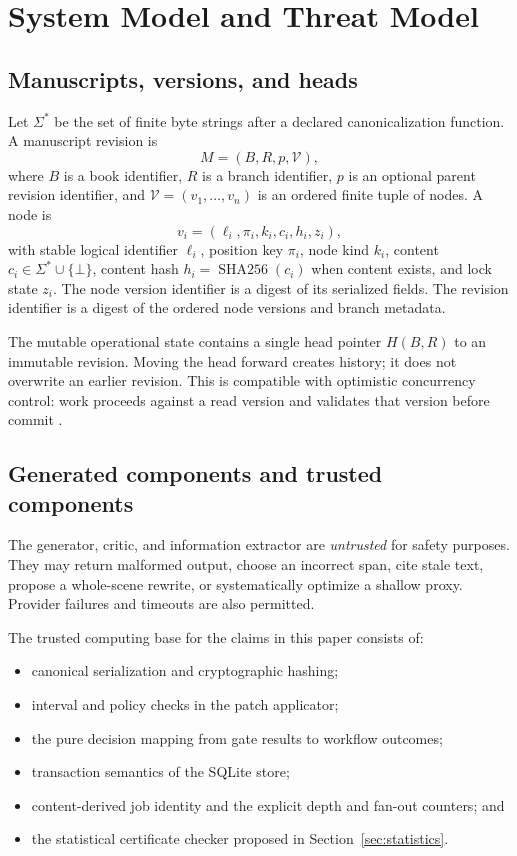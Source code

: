 \documentclass[11pt]{article}
\newcommand{\sha}{\operatorname{SHA256}}
\begin{document}
\section{System Model and Threat Model}

\subsection{Manuscripts, versions, and heads}

Let $\Sigma^*$ be the set of finite byte strings after a declared canonicalization function.
A manuscript revision is
\[
  M = (B, R, p, \mathcal{V}),
\]
where $B$ is a book identifier, $R$ is a branch identifier, $p$ is an optional parent
revision identifier, and $\mathcal{V}=(v_1,\ldots,v_n)$ is an ordered finite tuple of nodes.
A node is
\[
  v_i=(\ell_i,\pi_i,k_i,c_i,h_i,z_i),
\]
with stable logical identifier $\ell_i$, position key $\pi_i$, node kind $k_i$, content
$c_i\in\Sigma^*\cup\{\bot\}$, content hash $h_i=\sha(c_i)$ when content exists, and lock
state $z_i$. The node version identifier is a digest of its serialized fields. The revision
identifier is a digest of the ordered node versions and branch metadata.

The mutable operational state contains a single head pointer $H(B,R)$ to an immutable
revision. Moving the head forward creates history; it does not overwrite an earlier
revision. This is compatible with optimistic concurrency control: work proceeds against a
read version and validates that version before commit \cite{kung1981optimistic}.

\subsection{Generated components and trusted components}

The generator, critic, and information extractor are \emph{untrusted} for safety purposes.
They may return malformed output, choose an incorrect span, cite stale text, propose a
whole-scene rewrite, or systematically optimize a shallow proxy. Provider failures and
timeouts are also permitted.

The trusted computing base for the claims in this paper consists of:

\begin{itemize}
  \item canonical serialization and cryptographic hashing;
  \item interval and policy checks in the patch applicator;
  \item the pure decision mapping from gate results to workflow outcomes;
  \item transaction semantics of the SQLite store;
  \item content-derived job identity and the explicit depth and fan-out counters; and
  \item the statistical certificate checker proposed in Section~\ref{sec:statistics}.
\end{itemize}
\end{document}
